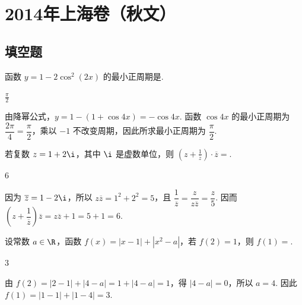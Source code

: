 \chapter{2014年上海卷（秋文）}

\section{填空题}

\begin{problem}
函数 \( y = 1 - 2\cos^{2}(2x) \) 的最小正周期是\fillinblank{}.

\begin{answer}
\(\frac{\pi}{2}\)
\end{answer}

\begin{solution}
由降幂公式，\(y=1-\left(1+\cos4x\right)=-\cos4x\). 函数 \(\cos4x\) 的最小正周期为 \(\dfrac{2\pi}{4}=\dfrac{\pi}{2}\)，乘以 \(-1\) 不改变周期，因此所求最小正周期为 \(\dfrac{\pi}{2}\).
\end{solution}
\end{problem}

\begin{problem}
若复数 \(z = 1 + 2\i\)，其中 \(\i\) 是虚数单位，则 \(\left(z + \frac{1}{\overline{z}}\right) \cdot \overline{z} =\)\fillinblank{}.

\begin{answer}
\(6\)
\end{answer}

\begin{solution}
因为 \(\overline z=1-2\i\)，所以 \(z\overline z=1^2+2^2=5\)，且 \(\dfrac{1}{\overline z}=\dfrac{z}{z\overline z}=\dfrac{z}{5}\). 因而
\(\left(z+\dfrac{1}{\overline z}\right)\overline z=z\overline z+1=5+1=6\).
\end{solution}
\end{problem}

\begin{problem}
设常数 \(a \in \R\)，函数 \(f(x) = |x - 1| + |x^2 - a|\)，若 \(f(2) = 1\)，则 \(f(1) =\)\fillinblank{}.

\begin{answer}
\(3\)
\end{answer}

\begin{solution}
由 \(f(2)=|2-1|+|4-a|=1+|4-a|=1\)，得 \(|4-a|=0\)，所以 \(a=4\). 因此 \(f(1)=|1-1|+|1-4|=3\).
\end{solution}
\end{problem}

